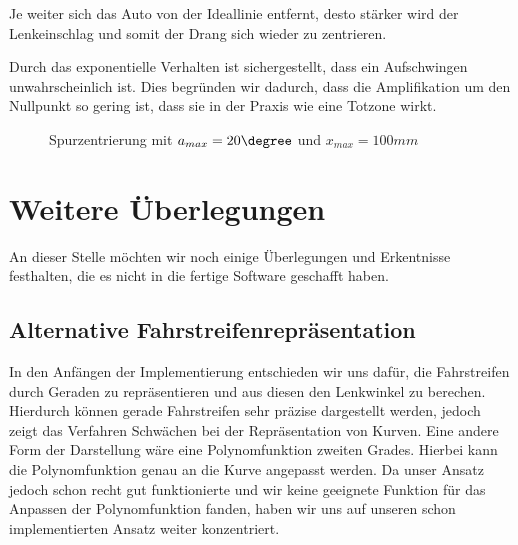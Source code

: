 \documentclass[a4paper,12pt]{report}
\begin{document}
	Je weiter sich das Auto von der Ideallinie entfernt, desto stärker wird der Lenkeinschlag und somit der Drang sich wieder zu zentrieren.

	Durch das exponentielle Verhalten ist sichergestellt, dass ein Aufschwingen unwahrscheinlich ist. Dies begründen wir dadurch, dass die Amplifikation um den Nullpunkt so gering ist, dass sie in der Praxis wie eine Totzone wirkt.

	\begin{figure}[ht]
		\centering


		\caption{Spurzentrierung mit $a_{max} = 20\degree$ und $x_{max} = 100mm$}
		\label{img-spurzentrierung-function}
	\end{figure}

\section{Weitere Überlegungen}
	An dieser Stelle möchten wir noch einige Überlegungen und Erkentnisse festhalten,
	die es nicht in die fertige Software geschafft haben.
	
\subsection{Alternative Fahrstreifenrepräsentation}
	In den Anfängen der Implementierung entschieden wir uns dafür, die Fahrstreifen durch Geraden zu repräsentieren und aus diesen den Lenkwinkel zu berechen. Hierdurch können gerade Fahrstreifen sehr präzise dargestellt werden, jedoch zeigt das Verfahren Schwächen bei der Repräsentation von Kurven. Eine andere Form der Darstellung wäre eine Polynomfunktion zweiten Grades. Hierbei kann die Polynomfunktion genau an die Kurve angepasst werden. Da unser Ansatz jedoch schon recht gut funktionierte und wir keine geeignete Funktion für das Anpassen der Polynomfunktion fanden, haben wir uns auf unseren schon implementierten Ansatz weiter konzentriert.
\end{document}
